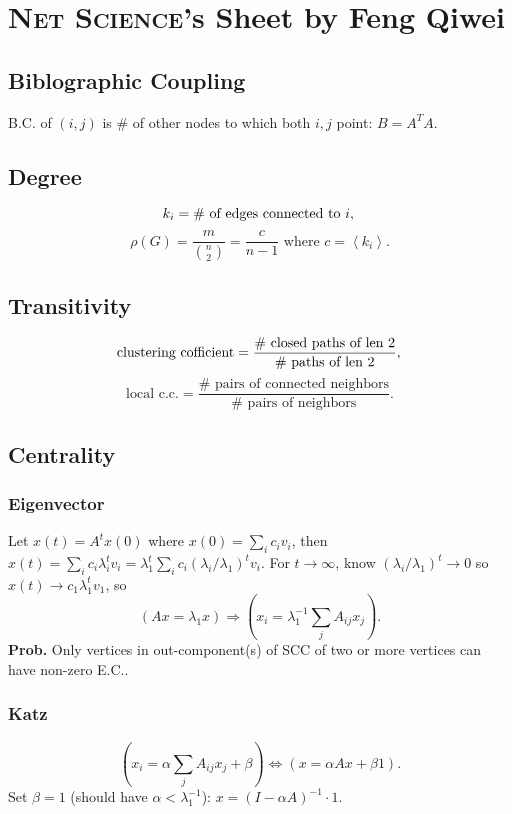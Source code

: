 \documentclass[a4paper,twocolumn,10pt]{article}
\newcommand{\ang}[1]{\left\langle {#1} \right\rangle}
\newcommand{\pte}[1]{\left({#1}\right)}
\begin{document}
\section*{\textsc{Net Science}'s Sheet {\large by Feng Qiwei}}

\subsection{Biblographic Coupling}
	B.C. of $(i,j)$ is $\#$ of other nodes to which both $i,j$ point:
	$B=A^T A$.

\subsection{Degree}
	\[
		k_i=\# \textrm{ of edges connected to }i, \\
	\]
	\[
		\rho(G)=\frac{m}{\binom{n}{2}} = \frac{c}{n-1}\textrm{ where }c=\ang{k_i}.
	\]

\subsection{Transitivity}
	\[
	\textrm{clustering cofficient} =
		\frac{\#\textrm{ closed paths of len 2}} {\#\textrm{ paths of len 2}}, \\
	\]
	\[
	\textrm{local c.c.} =
		\frac{\#\textrm{ pairs of connected neighbors}} {\#\textrm{ pairs of neighbors}}.
	\]

\subsection{Centrality}
	\subsubsection{Eigenvector}
		Let $x(t)=A^t x(0)$ where $x(0)=\sum_i c_i v_i$,
		then $x(t)=\sum_i c_i \lambda_i^t v_i=\lambda_1^t \sum_i c_i (\lambda_i/\lambda_1)^tv_i$.
		For $t\to\infty$, know $(\lambda_i/\lambda_1)^t\to 0$ so $x(t)\to c_1\lambda_1^t v_1$, so
		\[
			\pte{Ax = \lambda_1 x} \Longrightarrow
			\pte{x_i=\lambda_1^{-1} \sum_j A_{ij} x_j}.
		\]
		\textbf{Prob.}
		Only vertices in out-component(s) of SCC of two or more vertices can have
			non-zero E.C..

	\subsubsection{Katz}
		\[
			\pte{x_i = \alpha\sum_j A_{ij} x_j + \beta}
			\Longleftrightarrow
			\pte{x=\alpha Ax+\beta 1}.
		\]
		Set $\beta=1$ (should have $\alpha<\lambda_1^{-1}$):
			$x=(I-\alpha A)^{-1} \cdot 1$.
		
\end{document}
